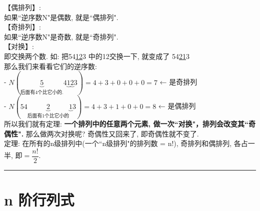 \documentclass[UTF8]{ctexart}
\begin{document}
	
	【偶排列】:\\
	如果``逆序数N"是偶数, 就是``偶排列". \\
	
	
	【奇排列】:\\
	如果``逆序数N"是奇数, 就是``奇排列".	\\
	
	【对换】:\\
	即交换两个数. 如: 把54\underline{12}3 中的12交换一下, 就变成了 54\underline{21}3 \\
	那么我们来看看它们的逆序数:\\
	- $N\left( \underset{\text{后面有4个比它小的}.}{\underbrace{5}}4\underset{}{\underbrace{1}}\underset{}{\underbrace{2}}3 \right) =4+3+0+0+0=7	$ ← 是奇排列\\
	- $N\left( 54\underset{\text{后面有1个比它小的}}{\underbrace{2}}\underset{}{\underbrace{1}}3 \right) =4+3+1+0+0=8		$ ← 是偶排列\\
	
	所以我们就有定理: \textbf{一个排列中的任意两个元素, 做一次``对换"，排列会改变其``奇偶性".} 那么做两次对换呢? 奇偶性又回来了, 即奇偶性就不变了. \\
	
	定理: 在所有的n级排列中(一个``n级排列"的排列数 = n!), 奇排列和偶排列, 各占一半, 即$=\dfrac{n!}{2}$.\\
	
	

	\hrule

	
	\section{n 阶行列式}
	
\end{document}

